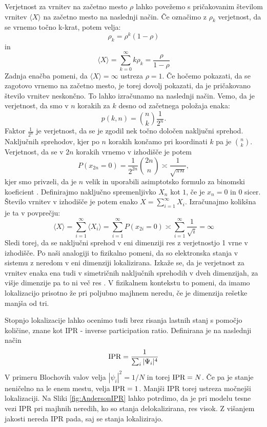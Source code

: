 Verjetnost za vrnitev na začetno mesto $\rho$ lahko povežemo s pričakovanim številom vrnitev $\langle X \rangle$ na začetno mesto na naslednji način.
Če označimo z $\rho_k$ verjetnost, da se vrnemo točno k-krat, potem velja:
\begin{equation}
\rho_k = \rho^k(1-\rho)
\end{equation}
in
\begin{equation}
\langle X \rangle = \sum_{k=0}^\infty k \rho_k = \frac{\rho}{1-\rho}
\end{equation}
Zadnja enačba pomeni, da $\langle X \rangle = \infty$ ustreza $\rho = 1$. Če hočemo pokazati, da se zagotovo vrnemo na začetno mesto, je torej dovolj pokazati, da je pričakovano število vrnitev neskončno.
To lahko izračunamo na naslednji način. Vemo, da je verjetnost, da smo v $n$ korakih za $k$ desno od začetnega položaja enaka:
\begin{equation}
p(k,n) = \binom{n}{k}\frac{1}{2^n}.
\end{equation}
Faktor $\frac{1}{2^n}$ je verjetnost, da se je zgodil nek točno določen naključni sprehod. Naključnih sprehodov, kjer po $n$ korakih končamo pri koordinati $k$ pa je $\binom{n}{k}$.
Verjetnost, da se v $2n$ korakih vrnemo v izhodišče je potem
\begin{equation}
P(x_{2n}=0) = \frac{1}{2^{2n}} \binom{2n}{n} \asymp \frac{1}{\sqrt{\pi n}},
\end{equation}
kjer smo privzeli, da je $n$ velik in uporabili asimptotsko formulo za binomski koeficient \cite{binomial}.
Definirajmo naključno spremenljivko $X_n$ kot $1$, če je $x_n=0$ in $0$ sicer.
Število vrnitev v izhodišče je potem enako $X=\sum_{i=1}^\infty X_i$. Izračunajmo kolikšna je ta v povprečju:
\begin{equation}
\langle X \rangle = \sum_{i=1}^\infty \langle X_i \rangle = \sum_{i=1}^\infty P(x_{2i}=0) \asymp \sum_{i=1}^\infty \frac{1}{\sqrt{i}} = \infty
\end{equation}
Sledi torej, da se naključni sprehod v eni dimenziji res z verjetnostjo 1 vrne v izhodišče.
Po naši analogiji to fizikalno pomeni, da so elektronska stanja v sistemu z neredom v eni dimenziji lokalizirana.
Izkaže se, da je verjetnost za vrnitev enaka ena tudi v simetričnih naključnih sprehodih v dveh dimenzijah, za višje dimenzije pa to ni več res \cite{randomwalk}.
V fizikalnem kontekstu to pomeni, da imamo lokalizacijo prisotno že pri poljubno majhnem neredu, če je dimenzija rešetke manjša od tri.

Stopnjo lokalizacije lahko ocenimo tudi brez risanja lastnih stanj s pomočjo količine, znane kot IPR - inverse participation ratio. Definirana je na naslednji način
\begin{equation}
\textup{IPR} = \frac{1}{\sum_i |\Psi_i|^4}
\end{equation}
V primeru Blochovih valov velja $|\psi_i|^2 = 1/N$ in torej $\textup{IPR} = N$.
Če pa je stanje neničelno na le enem mestu, velja $\textup{IPR}=1$.
Manjši IPR torej ustreza močnejši lokalizaciji. Na Sliki \ref{fig:AndersonIPR} lahko potrdimo, da je pri modelu tesne vezi IPR pri majhnih neredih, ko so stanja delokalizirana, res visok. Z višanjem jakosti nereda IPR pada, saj se stanja lokalizirajo.

